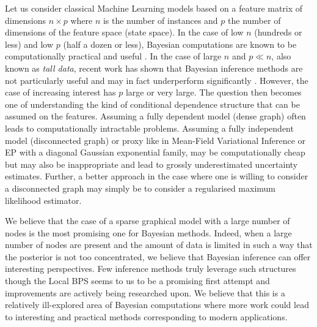 Let us consider classical Machine Learning models based on a feature matrix of dimensions $n \times p$ where $n$ is the number of instances and $p$ the number of dimensions of the feature space (state space). In the case of low $n$ (hundreds or less) and low $p$ (half a dozen or less), Bayesian computations are known to be computationally practical and useful \citep{gelman13}. 
In the case of large $n$ and $p\ll n$, also known as \emph{tall data}, recent work has shown that Bayesian inference methods are not particularly useful and may in fact underperform significantly \citep{bardenet17, nagapetyan17}. 
However, the case of increasing interest has $p$ large or very large. 
The question then becomes one of understanding the kind of conditional dependence structure that can be assumed on the features. 
Assuming a fully dependent model (dense graph) often leads to computationally intractable problems. 
Assuming a fully independent model (disconnected graph) or proxy like in Mean-Field Variational Inference or EP with a diagonal Gaussian exponential family, may be computationally cheap but may also be inappropriate and lead to grossly underestimated uncertainty estimates.
Further, a better approach in the case where one is willing to consider a disconnected graph may simply be to consider a regularised maximum likelihood estimator.
 
We believe that the case of a sparse graphical model with a large number of nodes is the most promising one for Bayesian methods.
Indeed, when a large number of nodes are present and the amount of data is limited in such a way that the posterior is not too concentrated, we believe that Bayesian inference can offer interesting perspectives.
Few inference methods truly leverage such structures though the Local BPS seems to us to be a promising first attempt and improvements are actively being researched upon.
We believe that this is a relatively ill-explored area of Bayesian computations where more work could lead to interesting and practical methods corresponding to modern applications.
